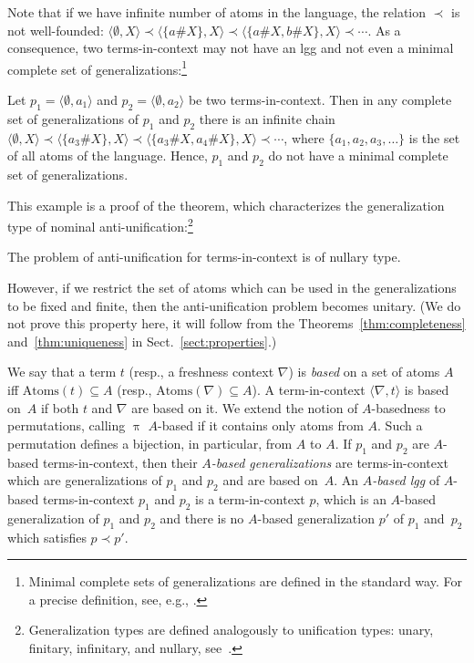 \documentclass{llncs}
\newcommand\ppi{\uppi}
\newcommand{\np}[2]{\langle #1, \allowbreak #2\rangle}
\newcommand{\atoms}{\mathrm{Atoms}}
\begin{document}
Note that if we have infinite number of atoms in the language, the
relation $\prec$ is not well-founded: $\np{\emptyset}{X}\prec
\np{\{a\#X\}}{X}\prec \np{\{a\#X,b\#X\}}{X}\prec \cdots$. As a
consequence, two terms-in-context may not have an lgg and not even a
minimal complete set of generalizations:\footnote{Minimal complete
  sets of generalizations are defined in the standard way. For a
  precise definition, see, e.g.,
  \cite{DBLP:conf/lopstr/AlpuenteEMO08,DBLP:conf/rta/KutsiaLV11}.}

\begin{example}\label{exmp:nullary}
  Let $p_1=\np{\emptyset}{a_1}$ and $p_2=\np{\emptyset}{a_2}$ be two
  terms-in-context. Then in any complete set of generalizations of $p_1$
  and $p_2$ there is an infinite chain $\np{\emptyset}{X}\prec
  \np{\{a_3\#X\}}{X}\prec \np{\{a_3\#X,a_4\#X\}}{X}\prec \cdots$,
  where $\{a_1,a_2,a_3,\ldots\}$ is the set of all atoms
  of the language. Hence, $p_1$ and $p_2$ do not have a minimal
  complete set of generalizations.
\end{example} 

This example is a proof of the theorem, which characterizes the
generalization type of nominal
anti-unification:\footnote{Generalization types are defined
  analogously to unification types: unary, finitary,
    infinitary, and nullary, see~\cite{DBLP:conf/rta/KutsiaLV11}.}

\begin{theorem}
  \label{thm:generalization:type}
   The problem of anti-unification for terms-in-context is of nullary type.
\end{theorem}

However, if we restrict the set of atoms which can be used in the
generalizations to be fixed and finite, then the anti-unification problem
becomes unitary. (We do not prove this property here, it will follow
from the Theorems~\ref{thm:completeness} and~\ref{thm:uniqueness} in
Sect.~\ref{sect:properties}.)

\begin{definition}
We say that a term $ t$ (resp., a freshness context $\nabla$)
is \emph{based} on a set of atoms $A$ iff 
$\atoms({ t})\subseteq A$ (resp., $\atoms(\nabla)\subseteq
A$). A term-in-context $\np{\nabla}{t}$ is based on~$A$ if both
$ t$ and $\nabla$ are based on it. We extend the notion of $A$-basedness to permutations, calling $\ppi$ $A$-based if it contains only atoms from $A$. 
Such a permutation defines a bijection, in particular, from $A$ to $A$. 
If $p_1$ and $p_2$ are $A$-based
terms-in-context, then their \emph{$A$-based generalizations} are
terms-in-context which are generalizations of $p_1$ and $p_2$ and are
based on~$A$. An \emph{$A$-based lgg} of $A$-based
terms-in-context $p_1$ and $p_2$ is a term-in-context $p$, which is an
$A$-based generalization of $p_1$ and $p_2$ and there is no
$A$-based generalization $p'$ of $p_1$ and~$p_2$ which satisfies
$p\prec p'$. 
\end{definition}
\end{document}

